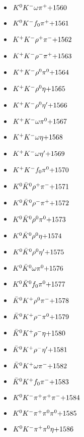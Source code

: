 \begin{multicols}{3}
\begin{itemize}
 \item $ K^{0} K^{-} \omega \pi^{+} \hfill{+1560}$
 \item $ K^{0} K^{-} f_{0} \pi^{+} \hfill{+1561}$
 \item $ K^{+} K^{-} \rho^{+} \pi^{-} \hfill{+1562}$
 \item $ K^{+} K^{-} \rho^{-} \pi^{+} \hfill{+1563}$
 \item $ K^{+} K^{-} \rho^{0} \pi^{0} \hfill{+1564}$
 \item $ K^{+} K^{-} \rho^{0} \eta \hfill{+1565}$
 \item $ K^{+} K^{-} \rho^{0} {\eta^{\prime}} \hfill{+1566}$
 \item $ K^{+} K^{-} \omega \pi^{0} \hfill{+1567}$
 \item $ K^{+} K^{-} \omega \eta \hfill{+1568}$
 \item $ K^{+} K^{-} \omega {\eta^{\prime}} \hfill{+1569}$
 \item $ K^{+} K^{-} f_{0} \pi^{0} \hfill{+1570}$
 \item $ K^{0} \bar{K}^{0} \rho^{+} \pi^{-} \hfill{+1571}$
 \item $ K^{0} \bar{K}^{0} \rho^{-} \pi^{+} \hfill{+1572}$
 \item $ K^{0} \bar{K}^{0} \rho^{0} \pi^{0} \hfill{+1573}$
 \item $ K^{0} \bar{K}^{0} \rho^{0} \eta \hfill{+1574}$
 \item $ K^{0} \bar{K}^{0} \rho^{0} {\eta^{\prime}} \hfill{+1575}$
 \item $ K^{0} \bar{K}^{0} \omega \pi^{0} \hfill{+1576}$
 \item $ K^{0} \bar{K}^{0} f_{0} \pi^{0} \hfill{+1577}$
 \item $ \bar{K}^{0} K^{+} \rho^{0} \pi^{-} \hfill{+1578}$
 \item $ \bar{K}^{0} K^{+} \rho^{-} \pi^{0} \hfill{+1579}$
 \item $ \bar{K}^{0} K^{+} \rho^{-} \eta \hfill{+1580}$
 \item $ \bar{K}^{0} K^{+} \rho^{-} {\eta^{\prime}} \hfill{+1581}$
 \item $ \bar{K}^{0} K^{+} \omega \pi^{-} \hfill{+1582}$
 \item $ \bar{K}^{0} K^{+} f_{0} \pi^{-} \hfill{+1583}$
 \item $ K^{0} K^{-} \pi^{+} \pi^{+} \pi^{-} \hfill{+1584}$
 \item $ K^{0} K^{-} \pi^{+} \pi^{0} \pi^{0} \hfill{+1585}$
 \item $ K^{0} K^{-} \pi^{+} \pi^{0} \eta \hfill{+1586}$

\end{itemize}
\end{multicols}
